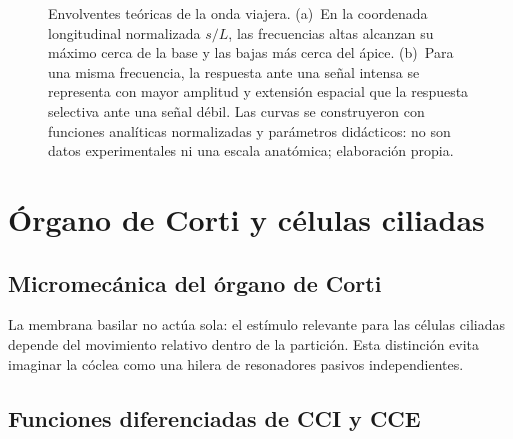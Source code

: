 \begin{figure}[htbp]
    \centering
    
    \caption{Envolventes teóricas de la onda viajera. (a)~En la coordenada
    longitudinal normalizada \(s/L\), las frecuencias altas alcanzan su máximo
    cerca de la base y las bajas más cerca del ápice. (b)~Para una misma
    frecuencia, la respuesta ante una señal intensa se representa con mayor
    amplitud y extensión espacial que la respuesta selectiva ante una señal
    débil. Las curvas se construyeron con funciones analíticas normalizadas y
    parámetros didácticos: no son datos experimentales ni una escala
    anatómica; elaboración propia.}
    \label{fig:u6-onda-viajera-tonotopia}
\end{figure}

\section{Órgano de Corti y células ciliadas}
\label{sec:u6-organo-corti}

\subsection{Micromecánica del órgano de Corti}
\label{sec:u6-micromecanica}


La membrana basilar no actúa sola: el estímulo relevante para las células
ciliadas depende del movimiento relativo dentro de la partición. Esta
distinción evita imaginar la cóclea como una hilera de resonadores pasivos
independientes.

\subsection{Funciones diferenciadas de CCI y CCE}
\label{sec:u6-cci-cce}


